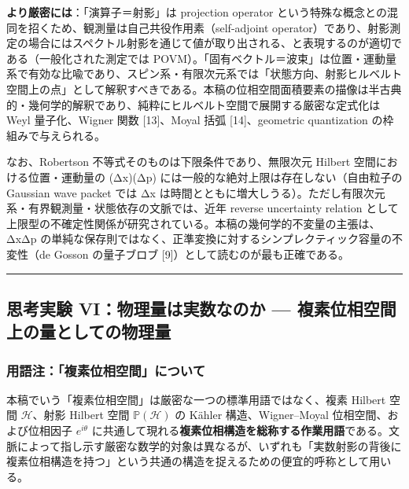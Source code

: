 \documentclass[
]{ltjsarticle}
\begin{document}
\textbf{より厳密には}：「演算子＝射影」は projection operator
という特殊な概念との混同を招くため、観測量は自己共役作用素（self-adjoint
operator）であり、射影測定の場合にはスペクトル射影を通じて値が取り出される、と表現するのが適切である（一般化された測定では
POVM）。「固有ベクトル＝波束」は位置・運動量系で有効な比喩であり、スピン系・有限次元系では「状態方向、射影ヒルベルト空間上の点」として解釈すべきである。本稿の位相空間面積要素の描像は半古典的・幾何学的解釈であり、純粋にヒルベルト空間で展開する厳密な定式化は
Weyl 量子化、Wigner 関数 {[}13{]}、Moyal 括弧 {[}14{]}、geometric
quantization の枠組みで与えられる。

なお、Robertson 不等式そのものは下限条件であり、無限次元 Hilbert
空間における位置・運動量の (Δx)(Δp)
には一般的な絶対上限は存在しない（自由粒子の Gaussian wave packet では
Δx
は時間とともに増大しうる）。ただし有限次元系・有界観測量・状態依存の文脈では、近年
reverse uncertainty relation
として上限型の不確定性関係が研究されている。本稿の幾何学的不変量の主張は、ΔxΔp
の単純な保存則ではなく、正準変換に対するシンプレクティック容量の不変性（de
Gosson の量子ブロブ {[}9{]}）として読むのが最も正確である。

\begin{center}\rule{0.5\linewidth}{0.5pt}\end{center}

\subsection{思考実験 VI：物理量は実数なのか ---
複素位相空間上の量としての物理量}\label{ux601dux8003ux5b9fux9a13-viux7269ux7406ux91cfux306fux5b9fux6570ux306aux306eux304b-ux8907ux7d20ux4f4dux76f8ux7a7aux9593ux4e0aux306eux91cfux3068ux3057ux3066ux306eux7269ux7406ux91cf}

\subsubsection{用語注：「複素位相空間」について}\label{ux7528ux8a9eux6ce8ux8907ux7d20ux4f4dux76f8ux7a7aux9593ux306bux3064ux3044ux3066}

本稿でいう「複素位相空間」は厳密な一つの標準用語ではなく、複素 Hilbert
空間 \(\mathcal{H}\)、射影 Hilbert 空間 \(\mathbb{P}(\mathcal{H})\) の
Kähler 構造、Wigner--Moyal 位相空間、および位相因子 \(e^{i\theta}\)
に共通して現れる\textbf{複素位相構造を総称する作業用語}である。文脈によって指し示す厳密な数学的対象は異なるが、いずれも「実数射影の背後に複素位相構造を持つ」という共通の構造を捉えるための便宜的呼称として用いる。
\end{document}
